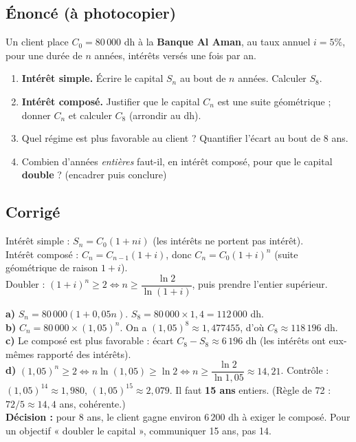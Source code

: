 \documentclass[12pt,a4paper]{article}
\begin{document}
\subsection{Énoncé (à photocopier)}

\begin{exobox}
Un client place $C_0 = 80\,000$ dh à la \textbf{Banque Al Aman}, au taux annuel $i=5\%$, pour une durée de $n$ années, intérêts versés une fois par an.
\begin{enumerate}[label=\alph*)]
  \item \textbf{Intérêt simple.} Écrire le capital $S_n$ au bout de $n$ années. Calculer $S_8$.
  \item \textbf{Intérêt composé.} Justifier que le capital $C_n$ est une suite géométrique ; donner $C_n$ et calculer $C_8$ (arrondir au dh).
  \item Quel régime est plus favorable au client ? Quantifier l'écart au bout de 8 ans.
  \item Combien d'années \emph{entières} faut-il, en intérêt composé, pour que le capital \textbf{double} ? (encadrer puis conclure)
\end{enumerate}
\end{exobox}

\subsection{Corrigé}

\begin{methodebox}[Capitalisation]
Intérêt simple : $S_n=C_0(1+ni)$ (les intérêts ne portent pas intérêt).\\
Intérêt composé : $C_{n}=C_{n-1}(1+i)$, donc $C_n=C_0(1+i)^n$ (suite géométrique de raison $1+i$).\\
Doubler : $(1+i)^n\geqslant 2 \Leftrightarrow n\geqslant \dfrac{\ln 2}{\ln(1+i)}$, puis prendre l'entier supérieur.
\end{methodebox}

\begin{corrigebox}
\textbf{a)} $S_n=80\,000(1+0{,}05n)$. $S_8=80\,000\times 1{,}4=112\,000$ dh.\\
\textbf{b)} $C_n=80\,000\times(1{,}05)^n$. On a $(1{,}05)^8 \approx 1{,}477455$, d'où $C_8 \approx 118\,196$ dh.\\
\textbf{c)} Le composé est plus favorable : écart $C_8-S_8\approx 6\,196$ dh (les intérêts ont eux-mêmes rapporté des intérêts).\\
\textbf{d)} $(1{,}05)^n\geqslant 2 \Leftrightarrow n\ln(1{,}05)\geqslant \ln 2 \Leftrightarrow n\geqslant \dfrac{\ln 2}{\ln 1{,}05}\approx 14{,}21$.
Contrôle : $(1{,}05)^{14}\approx 1{,}980$, $(1{,}05)^{15}\approx 2{,}079$. Il faut \textbf{15 ans} entiers. (Règle de 72 : $72/5\approx 14{,}4$ ans, cohérente.)\\
\textbf{Décision :} pour 8 ans, le client gagne environ $6\,200$ dh à exiger le composé. Pour un objectif « doubler le capital », communiquer 15 ans, pas 14.
\end{corrigebox}
\end{document}
